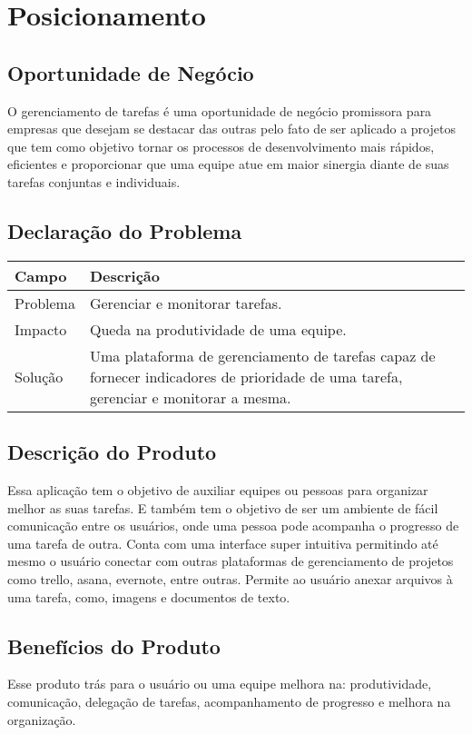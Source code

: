 \chapter{Posicionamento}

\section{Oportunidade de Negócio}


O gerenciamento de tarefas é uma oportunidade de negócio promissora para empresas que desejam se destacar das outras pelo fato de ser aplicado a projetos que tem como objetivo tornar os processos de desenvolvimento mais rápidos, eficientes e proporcionar que uma equipe atue em maior sinergia diante de suas tarefas conjuntas e individuais. 



\section{Declaração do Problema}
\begin{table}[htbp]
    \begin{tabularx}{\textwidth}{| l | X |}
    \hline
    Campo             & Descrição                                                                                                                                                                           \\ \hline
    Problema          & Gerenciar e monitorar tarefas.\\ \hline
    Impacto           & Queda na produtividade de uma equipe. \\ \hline
    Solução           & Uma plataforma de gerenciamento de tarefas capaz de fornecer indicadores de prioridade de uma tarefa, gerenciar e monitorar a mesma.\\ \hline
    \end{tabularx}
\end{table} 


\section{Descrição do Produto}
Essa aplicação tem o objetivo de auxiliar equipes ou pessoas para organizar melhor as suas tarefas. E também tem o objetivo de ser um ambiente de fácil comunicação entre os usuários, onde uma pessoa pode acompanha o progresso de uma tarefa de outra.
Conta com uma interface super intuitiva  permitindo até mesmo o usuário conectar com outras plataformas de gerenciamento de projetos como trello, asana, evernote, entre outras. 
Permite ao usuário anexar arquivos à uma tarefa, como, imagens e documentos de texto.


\section{Benefícios do Produto}
Esse produto trás para o usuário ou uma equipe melhora na: produtividade, comunicação, delegação de tarefas, acompanhamento de progresso e melhora na organização. 